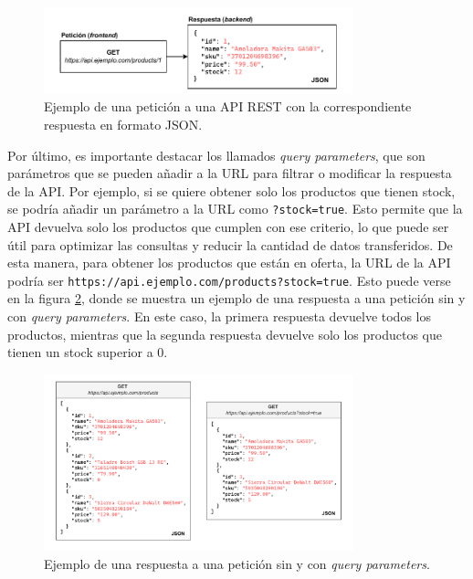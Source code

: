 \begin{figure}[H]
    \centering
    \includegraphics[width=0.8\textwidth]{figures/theoric_frame/api_example.pdf}
    \caption{Ejemplo de una petición a una API REST con la correspondiente respuesta en formato JSON.}
    \label{fig:api_example}
\end{figure}

Por último, es importante destacar los llamados \textit{query parameters}, que son parámetros que se pueden añadir a la URL para filtrar o modificar la respuesta de la API. Por ejemplo, si se quiere obtener solo los productos que tienen stock, se podría añadir un parámetro a la URL como \texttt{?stock=true}. Esto permite que la API devuelva solo los productos que cumplen con ese criterio, lo que puede ser útil para optimizar las consultas y reducir la cantidad de datos transferidos. De esta manera, para obtener los productos que están en oferta, la URL de la API podría ser \texttt{https://api.ejemplo.com/products?stock=true}. Esto puede verse en la figura \ref{fig:query_params_example}, donde se muestra un ejemplo de una respuesta a una petición sin y con \textit{query parameters}. En este caso, la primera respuesta devuelve todos los productos, mientras que la segunda respuesta devuelve solo los productos que tienen un stock superior a 0.

\begin{figure}[H]
    \centering
    \includegraphics[width=0.8\textwidth]{figures/theoric_frame/query_params_example.pdf}
    \caption{Ejemplo de una respuesta a una petición sin y con \textit{query parameters}.}
    \label{fig:query_params_example}
\end{figure}


